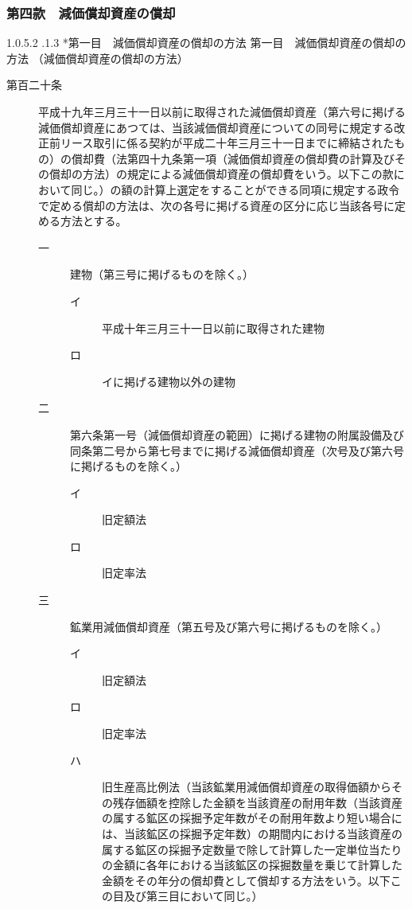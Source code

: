\documentclass[twocolumn,a4j,10pt]{ltjtarticle}
\makeatletter
\newcommand{\subsubsubsection}{\@startsection{paragraph}{4}{\z@}%
  {1.0\Cvs \@plus.5\Cdp \@minus.2\Cdp}%
  {.1\Cvs \@plus.3\Cdp}%
  {\reset@font\sffamily\normalsize}
}
\makeatother
\begin{document}
\subsubsection*{第四款　減価償却資産の償却}
\subsubsubsection*{第一目　減価償却資産の償却の方法}
{第一目　減価償却資産の償却の方法}
\noindent\hspace{10pt}（減価償却資産の償却の方法）
\begin{description}
\item[第百二十条]平成十九年三月三十一日以前に取得された減価償却資産（第六号に掲げる減価償却資産にあつては、当該減価償却資産についての同号に規定する改正前リース取引に係る契約が平成二十年三月三十一日までに締結されたもの）の償却費（法第四十九条第一項（減価償却資産の償却費の計算及びその償却の方法）の規定による減価償却資産の償却費をいう。以下この款において同じ。）の額の計算上選定をすることができる同項に規定する政令で定める償却の方法は、次の各号に掲げる資産の区分に応じ当該各号に定める方法とする。
\begin{description}
\item[一]建物（第三号に掲げるものを除く。）
\begin{description}
\item[イ]平成十年三月三十一日以前に取得された建物
\item[ロ]イに掲げる建物以外の建物
\end{description}
\item[二]第六条第一号（減価償却資産の範囲）に掲げる建物の附属設備及び同条第二号から第七号までに掲げる減価償却資産（次号及び第六号に掲げるものを除く。）
\begin{description}
\item[イ]旧定額法
\item[ロ]旧定率法
\end{description}
\item[三]鉱業用減価償却資産（第五号及び第六号に掲げるものを除く。）
\begin{description}
\item[イ]旧定額法
\item[ロ]旧定率法
\item[ハ]旧生産高比例法（当該鉱業用減価償却資産の取得価額からその残存価額を控除した金額を当該資産の耐用年数（当該資産の属する鉱区の採掘予定年数がその耐用年数より短い場合には、当該鉱区の採掘予定年数）の期間内における当該資産の属する鉱区の採掘予定数量で除して計算した一定単位当たりの金額に各年における当該鉱区の採掘数量を乗じて計算した金額をその年分の償却費として償却する方法をいう。以下この目及び第三目において同じ。）

\end{description}
\end{description}
\end{description}
\end{document}
